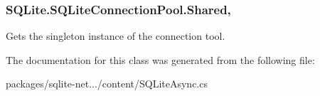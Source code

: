 \subsubsection[{Shared}]{ S\+Q\+Lite.\+S\+Q\+Lite\+Connection\+Pool.\+Shared\hspace{0.3cm}{\ttfamily [static]}, {\ttfamily [get]}}\label{classSQLite_1_1SQLiteConnectionPool_aaa23c37a087e3e04c4af6a69ce7cfb97}


Gets the singleton instance of the connection tool. 



The documentation for this class was generated from the following file\+:\begin{DoxyCompactItemize}
\item 
packages/sqlite-\/net.../content/S\+Q\+Lite\+Async.\+cs\end{DoxyCompactItemize}
